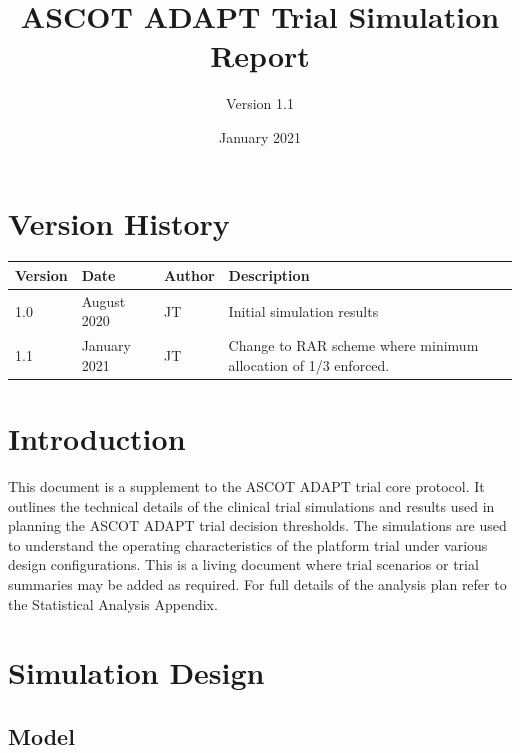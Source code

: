 \documentclass[
]{article}
\title{ASCOT ADAPT Trial Simulation Report}
\subtitle{Version 1.1}
\author{}
\date{\vspace{-2.5em}January 2021}
\begin{document}
\maketitle

{
\setcounter{tocdepth}{2}
\tableofcontents
}
\hypertarget{version-history}{%
\section*{Version History}\label{version-history}}

\begin{center}
    \begin{tabular}{lllp{5cm}}
    \hline
    Version & Date & Author & Description \\ \hline
    1.0 & August 2020  & JT & Initial simulation results \\ 
    1.1 & January 2021 & JT & Change to RAR scheme where minimum allocation of 1/3 enforced. \\ 
    \hline
    \end{tabular}
\end{center}

\clearpage

\hypertarget{introduction}{%
\section{Introduction}\label{introduction}}

This document is a supplement to the ASCOT ADAPT trial core protocol.
It outlines the technical details of the clinical trial simulations and results used in planning the ASCOT ADAPT trial decision thresholds.
The simulations are used to understand the operating characteristics of the platform trial under various design configurations.
This is a living document where trial scenarios or trial summaries may be added as required.
For full details of the analysis plan refer to the Statistical Analysis Appendix.

\clearpage

\hypertarget{simulation-design}{%
\section{Simulation Design}\label{simulation-design}}

\hypertarget{model}{%
\subsection{Model}\label{model}}
\end{document}
